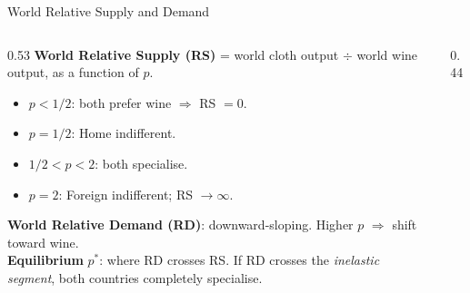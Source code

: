 \documentclass[aspectratio=169]{beamer}
\begin{document}
\begin{frame}{World Relative Supply and Demand}
\begin{columns}[T]
\begin{column}{0.53\textwidth}
\textbf{World Relative Supply (RS)} = world cloth
output $\div$ world wine output, as a function of $p$.
\begin{itemize}\small
  \item $p<1/2$: both prefer wine $\Rightarrow$ RS $=0$.
  \item $p=1/2$: Home indifferent.
  \item $1/2<p<2$: both specialise.
        
  \item $p=2$: Foreign indifferent; RS $\to\infty$.
\end{itemize}
\textbf{World Relative Demand (RD)}: downward-sloping.
Higher $p$ $\Rightarrow$ shift toward wine.\\[0.3em]
\textbf{Equilibrium} $p^{*}$: where RD crosses RS.
If RD crosses the \emph{inelastic segment}, both countries
completely specialise.
\end{column}
\begin{column}{0.44\textwidth}
\end{column}
\end{columns}
\end{frame}
\end{document}

